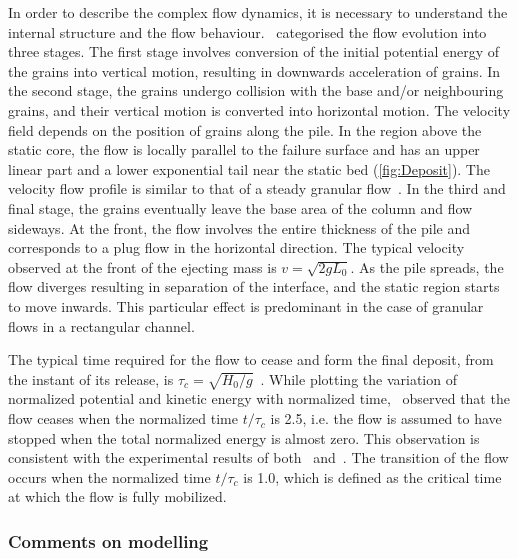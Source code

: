 In order to describe the complex flow dynamics, it is necessary to understand 
the internal structure and the flow behaviour.~\citep{Staron2007a} categorised 
the flow evolution into three stages. 
The first stage involves conversion of the initial potential energy of the 
grains into vertical motion, resulting in downwards acceleration of grains. In 
the second stage, the grains undergo collision with the base and/or 
neighbouring grains, and their vertical motion is converted into horizontal 
motion. The velocity field depends on the position of grains along the 
pile. In the region above the static core, the 
flow is locally parallel to the failure surface and has an upper linear part 
and a lower exponential tail near the static bed (\cref{fig:Deposit}). The 
velocity flow profile is similar to that of a steady granular 
flow~\citep{Midi2004}. In the third and final 
stage, the grains eventually leave the base area of the column and flow 
sideways. At the 
front, the flow involves the entire thickness of the pile and corresponds to a 
plug flow in the horizontal direction. The typical 
velocity observed at the front of the ejecting mass is 
$\textit{v}=\sqrt{2\textit{g}\textit{L}_{\textit{0}}}$. As the pile spreads, 
the flow diverges resulting in separation of the interface, and the static 
region starts to move inwards. This particular effect is 
predominant in the case of granular flows in a rectangular channel. 

The typical time required for the flow to cease and form the final 
deposit, from the instant of its release, is 
$\tau_c=\sqrt{\textit{H}_{\textit{0}}/\textit{g}}$~\citep{Staron2007a}. 
While plotting the variation of normalized potential and kinetic energy with 
normalized time,~\citet{Staron2007a} observed that the flow ceases when the 
normalized time $\textit{t}/\tau_c$ is 2.5, i.e. the flow is assumed to 
have stopped when the total normalized energy is almost zero. This observation 
is consistent with the experimental results of both~\citet{Lube2005} 
and~\citet{Lajeunesse2005}. The transition of the flow occurs when the 
normalized time $\textit{t}/\tau_c$ is 1.0, which is defined as the critical 
time at which the flow is fully mobilized.

\subsubsection{Comments on modelling}

